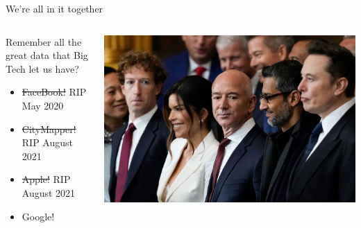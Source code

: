 \documentclass[
  ignorenonframetext,
  aspectratio=149,
]{beamer}
\providecommand{\tightlist}{%
  \setlength{\itemsep}{0pt}\setlength{\parskip}{0pt}}\usepackage{longtable,booktabs,array}
\begin{document}
\begin{frame}{We're all in it together}
\label{were-all-in-it-together-2}
\begin{columns}[T]
\begin{column}{0.6\textwidth}
Remember all the great data that Big Tech let us have?

\begin{itemize}
\tightlist
\item
  \st{FaceBook!} RIP May 2020
\item
  \st{CityMapper!} RIP August 2021
\item
  \st{Apple!} RIP August 2021
\item
  Google!
\end{itemize}
\end{column}

\begin{column}{0.4\textwidth}
\includegraphics{images/tech_knobs.jpeg}
\end{column}
\end{columns}
\end{frame}
\end{document}
